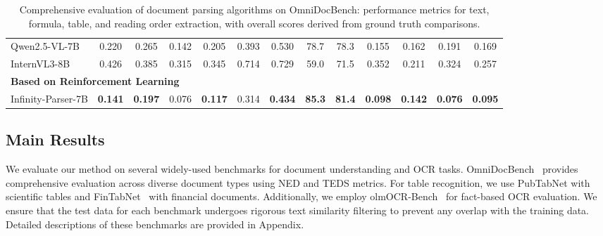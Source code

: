 \begin{table}[t]
\begin{threeparttable}
{\begin{tabular}{l cc | cc  cc cc cc cc }
    Qwen2.5-VL-7B~\citep{bai2025qwen2.5}
        & 0.220 & 0.265
        & 0.142 & 0.205
        & 0.393 & 0.530
        & 78.7 & 78.3
        & 0.155 & 0.162
        & 0.191 & 0.169 \\
    InternVL3-8B~\citep{zhu2025internvl3}
        & 0.426 & 0.385
        & 0.315 & 0.345
        & 0.714 & 0.729
        & 59.0 & 71.5
        & 0.352 & 0.211
        & 0.324 & 0.257 \\
    \midrule
    \multicolumn{6}{l}{\textbf{Based on Reinforcement Learning }} \\
    Infinity-Parser-7B
        & \textbf{0.141} & \textbf{0.197} 
        & 0.076  & \textbf{0.117 }
        & 0.314  & \textbf{0.434 }
        & \textbf{85.3} & \textbf{81.4}
        & \textbf{0.098} & \textbf{0.142}
        & \textbf{0.076} & \textbf{0.095} \\
      \bottomrule
      \end{tabular}%
    }%
  \end{threeparttable}
  \caption{Comprehensive evaluation of document parsing algorithms on OmniDocBench: performance metrics for text, formula, table, and reading order extraction, with overall scores derived from ground truth comparisons. }
  \label{result_label1}
\end{table}









\subsection{Main Results}



We evaluate our method on several widely-used benchmarks for document understanding and OCR tasks. OmniDocBench~\citep{ouyang2024omnidocbench} provides comprehensive evaluation across diverse document types using NED and TEDS metrics. %
For table recognition, we use PubTabNet with scientific tables and FinTabNet~\citep{zheng2021global} with financial documents. Additionally, we employ olmOCR-Bench~\citep{poznanski2025olmocr} for fact-based OCR evaluation. We ensure that the test data for each benchmark undergoes rigorous text similarity filtering to prevent any overlap with the training data.  Detailed descriptions of these benchmarks are provided in Appendix. 


